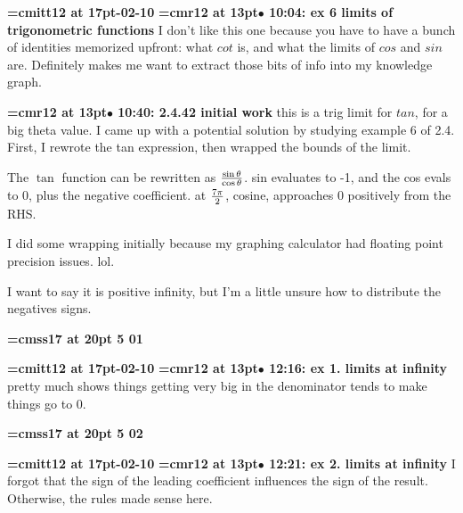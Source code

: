 {\medskip\noindent\bf\font\titlefont=cmitt12 at 17pt-02-10}\medskip
{\smallskip\noindent\bf\font\titlefont=cmr12 at 13pt\titlefont $\bullet$ 10:04: ex 6 limits of trigonometric functions}\smallskip
I don't like this one because you have to have a bunch of identities memorized upfront: what $cot$ is, and what the limits of $cos$ and $sin$ are. Definitely makes me want to extract those bits of info into my knowledge graph.
\par

{\smallskip\noindent\bf\font\titlefont=cmr12 at 13pt\titlefont $\bullet$ 10:40: 2.4.42 initial work}\smallskip
this is a trig limit for $tan$, for a big theta value. I came up with a potential solution by studying example 6 of 2.4. First, I rewrote the tan expression, then wrapped the bounds of the limit.
\par

The $\tan$ function can be rewritten as ${\sin \theta \over \cos \theta}$. sin evaluates to -1, and the cos evals to 0, plus the negative coefficient. at $7\pi \over 2$, cosine, approaches 0 positively from the RHS.
\par

I did some wrapping initially because my graphing calculator had floating point precision issues. lol.
\par

I want to say it is positive infinity, but I'm a little unsure how to distribute the negatives signs.
\par

{\medskip\noindent\bf\font\titlefont=cmss17 at 20pt 5 01}\medskip

{\medskip\noindent\bf\font\titlefont=cmitt12 at 17pt-02-10}\medskip
{\smallskip\noindent\bf\font\titlefont=cmr12 at 13pt\titlefont $\bullet$ 12:16: ex 1. limits at infinity}\smallskip
pretty much shows things getting very big in the denominator tends to make things go to 0.
\par

{\medskip\noindent\bf\font\titlefont=cmss17 at 20pt 5 02}\medskip

{\medskip\noindent\bf\font\titlefont=cmitt12 at 17pt-02-10}\medskip
{\smallskip\noindent\bf\font\titlefont=cmr12 at 13pt\titlefont $\bullet$ 12:21: ex 2. limits at infinity}\smallskip
I forgot that the sign of the leading coefficient influences the sign of the result. Otherwise, the rules made sense here.
\par

